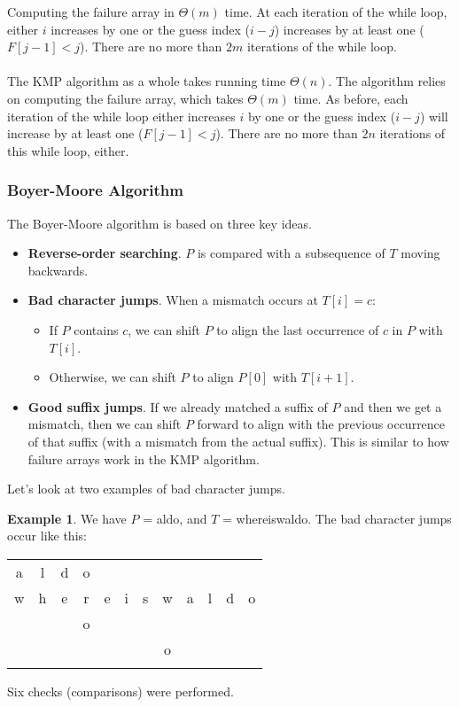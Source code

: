 \documentclass[]{article}
\theoremstyle{definition}
\newtheorem{ex}{Example}[section]
\begin{document}
				Computing the failure array in $\Theta(m)$ time. At each iteration of the while loop, either $i$ increases by one or the guess index ($i - j$) increases by at least one ($F[j - 1] < j$). There are no more than $2m$ iterations of the while loop.
				\\ \\
				The KMP algorithm as a whole takes running time $\Theta(n)$. The algorithm relies on computing the failure array, which takes $\Theta(m)$ time. As before, each iteration of the while loop either increases $i$ by one or the guess index ($i - j$) will increase by at least one ($F[j - 1] < j$). There are no more than $2n$ iterations of this while loop, either.

			\subsubsection{Boyer-Moore Algorithm}
				The Boyer-Moore algorithm is based on three key ideas.
				\begin{itemize}
					\item \textbf{Reverse-order searching}. $P$ is compared with a subsequence of $T$ moving backwards.
					\item \textbf{Bad character jumps}. When a mismatch occurs at $T[i] = c$:
						\begin{itemize}
							\item If $P$ contains $c$, we can shift $P$ to align the last occurrence of $c$ in $P$ with $T[i]$.
							\item Otherwise, we can shift $P$ to align $P[0]$ with $T[i + 1]$.
						\end{itemize}
					\item \textbf{Good suffix jumps}. If we already matched a suffix of $P$ and then we get a mismatch, then we can shift $P$ forward to align with the previous occurrence of that suffix (with a mismatch from the actual suffix). This is similar to how failure arrays work in the KMP algorithm.
				\end{itemize}

				Let's look at two examples of bad character jumps.

				\begin{ex}
					We have $P$ = aldo, and $T$ = whereiswaldo. The bad character jumps occur like this:
					\begin{center}
						\begin{tabular}{|c|c|c|c|c|c|c|c|c|c|c|c|}
							a & l & d & o & & & & & & & & \\
							w & h & e & r & e & i & s & w & a & l & d & o \\ \hline \hline
							& & & o & & & & & & & & \\
							& & & & & & & o & & & & \\
							& & & & & & & & \color{green}{a} & \color{green}{l} & \color{green}{d} & \color{green}{o} \\ \hline
						\end{tabular}
					\end{center}

					Six checks (comparisons) were performed.
				\end{ex}
\end{document}
